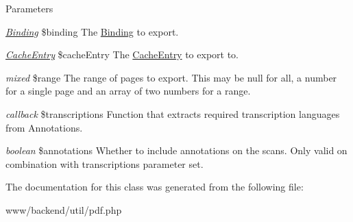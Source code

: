 \begin{DoxyParams}{Parameters}
\item[{\em \hyperlink{classBinding}{Binding}}]\$binding The \hyperlink{classBinding}{Binding} to export. \item[{\em \hyperlink{classCacheEntry}{CacheEntry}}]\$cacheEntry The \hyperlink{classCacheEntry}{CacheEntry} to export to. \item[{\em mixed}]\$range The range of pages to export. This may be null for all, a number for a single page and an array of two numbers for a range. \item[{\em callback}]\$transcriptions Function that extracts required transcription languages from Annotations. \item[{\em boolean}]\$annotations Whether to include annotations on the scans. Only valid on combination with transcriptions parameter set. \end{DoxyParams}


The documentation for this class was generated from the following file:\begin{DoxyCompactItemize}
\item 
www/backend/util/pdf.php\end{DoxyCompactItemize}
